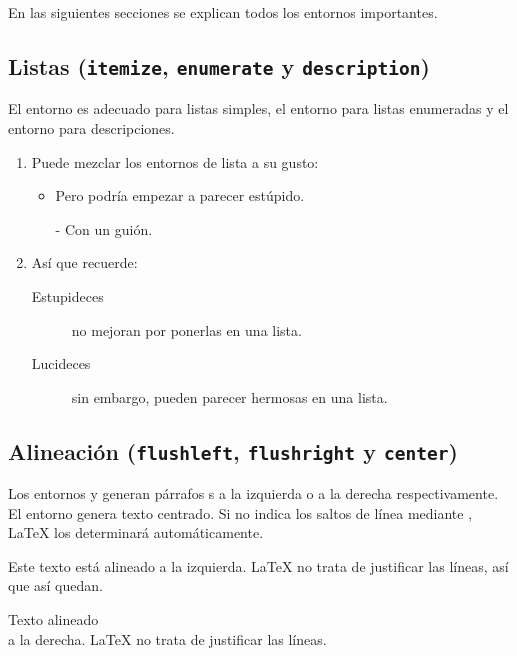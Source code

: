 En las siguientes secciones se explican todos los entornos importantes.

\subsection{Listas (\texttt{itemize}, \texttt{enumerate} y \texttt{description})}

El entorno  es adecuado para listas simples, el entorno  para listas enumeradas y el entorno  para descripciones.  

\begin{example}
\flushleft
\begin{enumerate}
\item Puede mezclar los 
entornos de lista a su gusto:
\begin{itemize}
\item Pero podría empezar a 
parecer estúpido.
\item[-] Con un guión.
\end{itemize}
\item Así que recuerde:
\begin{description}
\item[Estupideces] no mejoran 
por ponerlas en una lista.
\item[Lucideces] sin embargo, 
pueden parecer hermosas en 
una lista.
\end{description}
\end{enumerate}
\end{example}
 
\subsection{Alineación (\texttt{flushleft}, \texttt{flushright} y \texttt{center})}

Los entornos  y  generan párrafos s a la izquierda o a la derecha respectivamente. El entorno  genera texto centrado.  Si no indica los saltos de línea mediante \ci{\bs}, \LaTeX{} los determinará automáticamente.

\begin{example}
\begin{flushleft}
Este texto está alineado a 
la izquierda.  \LaTeX{} no trata 
de justificar las líneas, así
que así quedan.
\end{flushleft}
\end{example}

\begin{example}
\begin{flushright}
Texto alineado\\a la derecha.
\LaTeX{} no trata de 
justificar las líneas.
\end{flushright}
\end{example}

